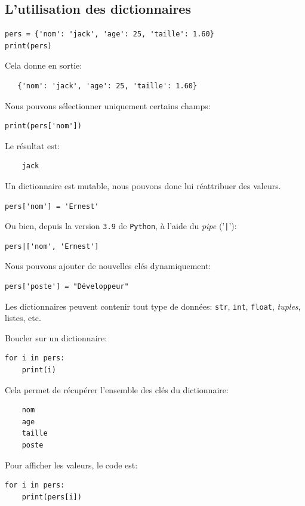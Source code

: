 \documentclass[a4paper,11pt]{book}
\begin{document}
\subsection*{L'utilisation des dictionnaires}\label{utilisation_dict}
\begin{lstlisting}
pers = {'nom': 'jack', 'age': 25, 'taille': 1.60}
print(pers)
\end{lstlisting}
\medskip

Cela donne en sortie:
\begin{verbatim}
   {'nom': 'jack', 'age': 25, 'taille': 1.60} 
\end{verbatim}
\medskip

Nous pouvons sélectionner uniquement certains champs:
\begin{lstlisting}
print(pers['nom'])
\end{lstlisting}
\medskip

Le résultat est:
\begin{verbatim}
    jack
\end{verbatim}
\medskip

Un dictionnaire est mutable, nous pouvons donc lui réattribuer des valeurs.
\begin{lstlisting}
pers['nom'] = 'Ernest'
\end{lstlisting}
\medskip

Ou bien, depuis la version \texttt{3.9} de \texttt{Python}, à l'aide du \og \textit{pipe}\fg{} ('\texttt{|}'):
\begin{lstlisting}
pers|['nom', 'Ernest']
\end{lstlisting}
\medskip

Nous pouvons ajouter de nouvelles clés dynamiquement:
\begin{lstlisting}
pers['poste'] = "Développeur"
\end{lstlisting}
\medskip

Les dictionnaires peuvent contenir tout type de données: \texttt{str}, \texttt{int}, \texttt{float}, \textit{tuples}, listes, etc.
\medskip

Boucler sur un dictionnaire:
\begin{lstlisting}
for i in pers:
    print(i)
\end{lstlisting}
\medskip

Cela permet de récupérer l'ensemble des clés du dictionnaire:
\begin{verbatim}
    nom
    age
    taille
    poste
\end{verbatim}
\medskip

Pour afficher les valeurs, le code est:
\begin{lstlisting}
for i in pers:
    print(pers[i])
\end{lstlisting}
\medskip
\end{document}
